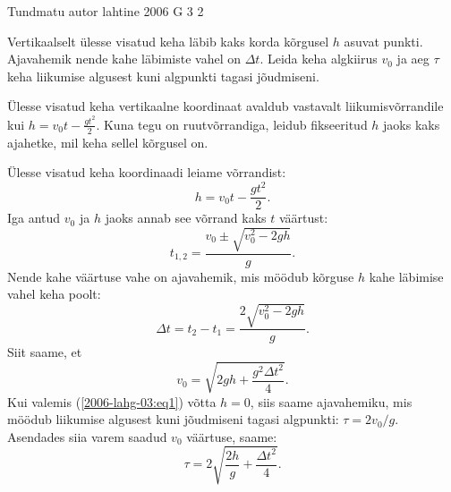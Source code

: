 {Tundmatu autor} %
{lahtine} %
{2006} %
{G 3} %
{2} %
{
\ifStatement
Vertikaalselt ülesse visatud keha läbib kaks korda kõrgusel $h$ asuvat punkti. Ajavahemik nende kahe läbimiste vahel on $\Delta t$. Leida keha algkiirus $v_0$ ja aeg $\tau$ keha liikumise algusest kuni algpunkti tagasi jõudmiseni.
\fi


\ifHint
Ülesse visatud keha vertikaalne koordinaat avaldub vastavalt liikumisvõrrandile kui $h = v_0t - \frac{gt^2}{2}$. Kuna tegu on ruutvõrrandiga, leidub fikseeritud $h$ jaoks kaks ajahetke, mil keha sellel kõrgusel on.
\fi


\ifSolution
Ülesse visatud keha koordinaadi leiame võrrandist: 
\[
h = v_0t - \frac{gt^2}{2}.
\]
Iga antud $v_0$ ja $h$ jaoks annab see võrrand kaks $t$ väärtust:
\[
t_{1,2}=\frac{v_{0} \pm \sqrt{v_{0}^{2}-2 g h}}{g}.
\]
Nende kahe väärtuse vahe on ajavahemik, mis möödub kõrguse $h$ kahe läbimise vahel keha poolt:
\begin{equation} \label{2006-lahg-03:eq1}
\Delta t=t_{2}-t_{1}=\frac{2 \sqrt{v_{0}^{2}-2 g h}}{g}.
\end{equation}
Siit saame, et
\[
v_{0}=\sqrt{2 g h+\frac{g^{2} \Delta t^{2}}{4}}.
\]
Kui valemis (\ref{2006-lahg-03:eq1}) võtta $h = 0$, siis saame ajavahemiku, mis möödub liikumise algusest kuni jõudmiseni tagasi algpunkti: $\tau = 2v_0/g$. Asendades siia varem saadud $v_0$ väärtuse, saame:
\[
\tau=2 \sqrt{\frac{2 h}{g}+\frac{\Delta t^{2}}{4}}.
\]
\fi
}